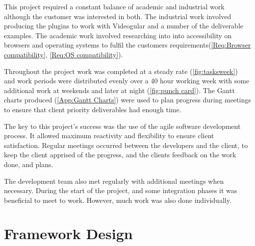 This project required a constant balance of academic and industrial work although the customer was interested in both. The industrial work involved producing the plugins to work with \gls{Videogular} and a number of the deliverable examples. The academic work involved researching into into accessibility on browsers and operating systems to fulfil the customers requirements(\cref{Req:Browser compatibility}, \cref{Req:OS compatibility}).

Throughout the project work was completed at a steady rate (\autoref{fig:tasksweek}) and work periods were distributed evenly over a 40 hour working week with some additional work at weekends and later at night (\autoref{fig:punch card}). The Gantt charts produced (\cref{App:Gantt Charts}) were used to plan progress during meetings to ensure that client priority deliverables had enough time.

The key to this project's success was the use of the agile software development
process. It allowed maximum reactivity and flexibility to ensure client
satisfaction. Regular meetings occurred between the developers and the client,
to keep the client apprised of the progress, and the clients feedback on the
work done, and plans.

The development team also met regularly with additional meetings when
necessary. During the start of the project, and some integration phases it was
beneficial to meet to work. However, much work was also done individually.









\section{Framework Design}


